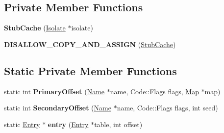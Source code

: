 \subsection*{Private Member Functions}
\begin{DoxyCompactItemize}
\item 
{\bfseries Stub\+Cache} (\hyperlink{classv8_1_1internal_1_1_isolate}{Isolate} $\ast$isolate)\hypertarget{classv8_1_1internal_1_1_stub_cache_a3da7a5deaea1235ff591685f3314ea9e}{}\label{classv8_1_1internal_1_1_stub_cache_a3da7a5deaea1235ff591685f3314ea9e}

\item 
{\bfseries D\+I\+S\+A\+L\+L\+O\+W\+\_\+\+C\+O\+P\+Y\+\_\+\+A\+N\+D\+\_\+\+A\+S\+S\+I\+GN} (\hyperlink{classv8_1_1internal_1_1_stub_cache}{Stub\+Cache})\hypertarget{classv8_1_1internal_1_1_stub_cache_a26ffce43906f690e8d134d710abf5d89}{}\label{classv8_1_1internal_1_1_stub_cache_a26ffce43906f690e8d134d710abf5d89}

\end{DoxyCompactItemize}
\subsection*{Static Private Member Functions}
\begin{DoxyCompactItemize}
\item 
static int {\bfseries Primary\+Offset} (\hyperlink{classv8_1_1internal_1_1_name}{Name} $\ast$name, Code\+::\+Flags flags, \hyperlink{classv8_1_1internal_1_1_map}{Map} $\ast$map)\hypertarget{classv8_1_1internal_1_1_stub_cache_a71067bca17c7de53d96834de64ccd87a}{}\label{classv8_1_1internal_1_1_stub_cache_a71067bca17c7de53d96834de64ccd87a}

\item 
static int {\bfseries Secondary\+Offset} (\hyperlink{classv8_1_1internal_1_1_name}{Name} $\ast$name, Code\+::\+Flags flags, int seed)\hypertarget{classv8_1_1internal_1_1_stub_cache_ab1646a7fff299b47a77fbc48cc0f20cb}{}\label{classv8_1_1internal_1_1_stub_cache_ab1646a7fff299b47a77fbc48cc0f20cb}

\item 
static \hyperlink{structv8_1_1internal_1_1_stub_cache_1_1_entry}{Entry} $\ast$ {\bfseries entry} (\hyperlink{structv8_1_1internal_1_1_stub_cache_1_1_entry}{Entry} $\ast$table, int offset)\hypertarget{classv8_1_1internal_1_1_stub_cache_a1c2a541bb2aabad9f4f4c133f40ddc76}{}\label{classv8_1_1internal_1_1_stub_cache_a1c2a541bb2aabad9f4f4c133f40ddc76}

\end{DoxyCompactItemize}
